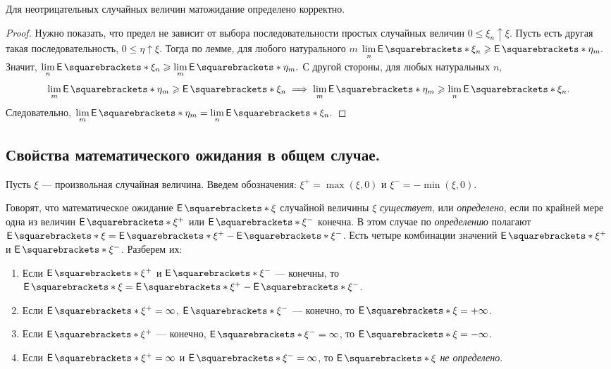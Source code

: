 \begin{consequence}
	Для неотрицательных случайных величин матожидание определено корректно.
\end{consequence}
\begin{proof}
	Нужно показать, что предел не зависит от выбора последовательности простых 
	случайных величин \(0 \leq \xi_n \uparrow \xi. \) Пусть есть другая такая 
	последовательность, \(0 \leq \eta \uparrow \xi. \) Тогда по лемме, для 
	любого натурального $ m $ \(\lim\limits_{n}\E{\xi_n} \geq \E{\eta_m}. \) 
	Значит, \(\lim\limits_{n}\E{\xi_n} \geq \lim\limits_{m}\E{\eta_m}. \)
	С другой стороны, для любых натуральных $ n $, \[\lim\limits_{m}\E{\eta_m} 
	\geq \E{\xi_n} \implies \lim\limits_{m}\E{\eta_m} \geq 
	\lim\limits_{n}\E{\xi_n}. \]
	Следовательно, \(\lim\limits_{m}\E{\eta_m} = \lim\limits_{n}\E{\xi_n}. \)
\end{proof}

\subsection {Свойства математического ожидания в общем случае.}
    Пусть $ \xi $ --- произвольная случайная величина. Введем обозначения: 
    \(\xi^+ = \max(\xi, 0) \) и \(\xi^- = -\min(\xi, 0). \)

\begin{definition}
    Говорят, что математическое ожидание \(\E{\xi} \) случайной величины $ \xi 
    $ \emph{существует}, или \emph{определено}, если по крайней мере одна из 
    величин $ \E{\xi^+} $ или $ \E{\xi^-} $ конечна. В этом случае по 
    \emph{определению} полагают \( \E{\xi} = \E{\xi^+} - \E{\xi^-} \).    
    Есть четыре комбинации значений $ \E{\xi^+} $ и $ \E{\xi^-} $. Разберем их:
    \begin{enumerate}
        \item Если $ \E{\xi^+} $ и $ \E{\xi^-} $ --- конечны, то \( \E{\xi} = 
        \E{\xi^+} - \E{\xi^-} \).
        \item Если  $ \E{\xi^+} = \infty $, $ \E{\xi^-} $ --- конечно, то $ 
        \E{\xi} = +\infty $.
        \item Если  $ \E{\xi^+} $ --- конечно, $ \E{\xi^-} = \infty $, то $ 
        \E{\xi} = -\infty $.
        \item Если  $ \E{\xi^+} = \infty $ и $ \E{\xi^-} = \infty $, то $ 
        \E{\xi} $ \emph{не определено}.
    \end{enumerate}
\end{definition}


